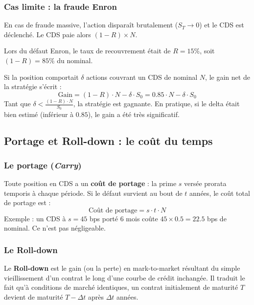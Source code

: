 \subsubsection{Cas limite : la fraude Enron}

\begin{exemple}[Enron (2001)]
En cas de fraude massive, l'action disparaît brutalement ($S_T \to 0$) et le CDS est déclenché. Le CDS paie alors $(1-R) \times N$.

Lors du défaut Enron, le taux de recouvrement était de $R = 15\%$, soit $(1 - R) = 85\%$ du nominal.

Si la position comportait $\delta$ actions couvrant un CDS de nominal $N$, le gain net de la stratégie s'écrit :
\[
\text{Gain} = (1-R) \cdot N - \delta \cdot S_0 = 0.85 \cdot N - \delta \cdot S_0
\]
Tant que $\delta < \frac{(1-R) \cdot N}{S_0}$, la stratégie est gagnante. En pratique, si le delta était bien estimé (inférieur à $0.85$), le gain a été très significatif.
\end{exemple}

\subsection{Portage et Roll-down : le coût du temps}

\subsubsection{Le portage (\textit{Carry})}

Toute position en CDS a un \textbf{coût de portage} : la prime $s$ versée prorata temporis à chaque période. Si le défaut survient au bout de $t$ années, le coût total de portage est :
\[
\text{Coût de portage} = s \cdot t \cdot N
\]
Exemple : un CDS à $s = 45$ bps porté 6 mois coûte $45 \times 0.5 = 22.5$ bps de nominal. Ce n'est pas négligeable.

\subsubsection{Le Roll-down}

\begin{definition}
Le \textbf{Roll-down} est le gain (ou la perte) en mark-to-market résultant du simple vieillissement d'un contrat le long d'une courbe de crédit inchangée. Il traduit le fait qu'à conditions de marché identiques, un contrat initialement de maturité $T$ devient de maturité $T - \Delta t$ après $\Delta t$ années.
\end{definition}

